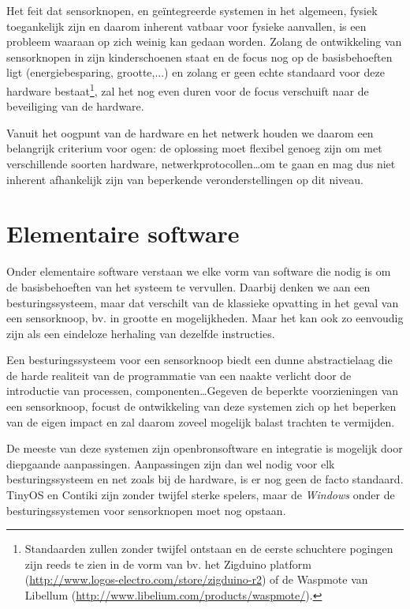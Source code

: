 Het feit dat sensorknopen, en ge\"integreerde systemen in het algemeen, fysiek
toegankelijk zijn en daarom inherent vatbaar voor fysieke aanvallen, is een
probleem waaraan op zich weinig kan gedaan worden. Zolang de ontwikkeling van
sensorknopen in zijn kinderschoenen staat en de focus nog op de basisbehoeften
ligt (energiebesparing, grootte,...) en zolang er geen echte standaard voor
deze hardware bestaat\footnote{Standaarden zullen zonder twijfel ontstaan en de
eerste schuchtere pogingen zijn reeds te zien in de vorm van bv. het Zigduino
platform (\url{http://www.logos-electro.com/store/zigduino-r2}) of de Waspmote
van Libellum (\url{http://www.libelium.com/products/waspmote/}).}, zal het nog
even duren voor de focus verschuift naar de beveiliging van de hardware.

Vanuit het oogpunt van de hardware en het netwerk houden we daarom een
belangrijk criterium voor ogen: de oplossing moet flexibel genoeg zijn om met
verschillende soorten hardware, netwerkprotocollen\dots om te gaan en mag dus
niet inherent afhankelijk zijn van beperkende veronderstellingen op dit niveau.

\vspace{-3mm}

\section{Elementaire software}
\label{section:solution-software}

Onder elementaire software verstaan we elke vorm van software die nodig is om
de basisbehoeften van het systeem te vervullen. Daarbij denken we aan een
besturingssysteem, maar dat verschilt van de klassieke opvatting in het geval
van een sensorknoop, bv. in grootte en mogelijkheden. Maar het kan ook zo
eenvoudig zijn als een eindeloze herhaling van dezelfde instructies.

Een besturingssysteem voor een sensorknoop biedt een dunne abstractielaag die
de harde realiteit van de programmatie van een naakte \mcu verlicht door de
introductie van processen, componenten\dots Gegeven de beperkte voorzieningen
van een sensorknoop, focust de ontwikkeling van deze systemen zich op het
beperken van de eigen impact en zal daarom zoveel mogelijk balast trachten te
vermijden.

De meeste van deze systemen zijn openbronsoftware en integratie is mogelijk
door diepgaande aanpassingen. Aanpassingen zijn dan wel nodig voor elk
besturingssysteem en net zoals bij de hardware, is er nog geen de facto
standaard. TinyOS en Contiki zijn zonder twijfel sterke spelers, maar de
\emph{Windows} onder de besturingssystemen voor sensorknopen moet nog opstaan.

